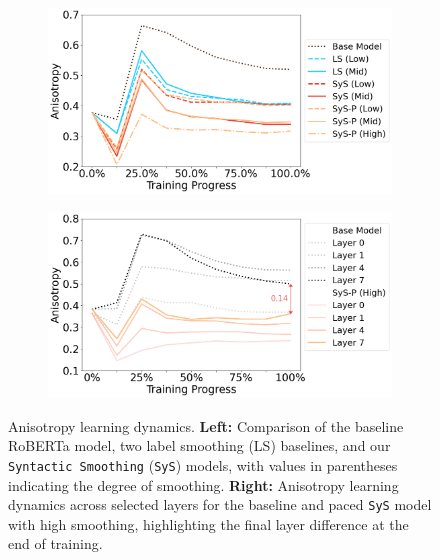 \begin{figure}[ht!]
    \centering
    \begin{subfigure}[b]{0.49\textwidth}
        \centering
        \includegraphics[width=\textwidth]{chapters/syntatic-smoothing/figures/anisotropy-learning-dynamics.png}
        \label{fig:anisotropy-learing-dynamics}
    \end{subfigure}
    \hfill
    \begin{subfigure}[b]{0.49\textwidth}
        \centering
        \includegraphics[width=\textwidth]{chapters/syntatic-smoothing/figures/anisotropy-layers.png}
        \label{fig:anisotropy-layers}
    \end{subfigure}
    \caption{Anisotropy learning dynamics. \textbf{Left:} Comparison of the baseline RoBERTa model, two label smoothing (LS) baselines, and our \texttt{Syntactic Smoothing} (\texttt{SyS}) models, with values in parentheses indicating the degree of smoothing. \textbf{Right:} Anisotropy learning dynamics across selected layers for the baseline and paced \texttt{SyS} model with high smoothing, highlighting the final layer difference at the end of training.}
    \label{fig:anisotropy-combined}
\end{figure}


